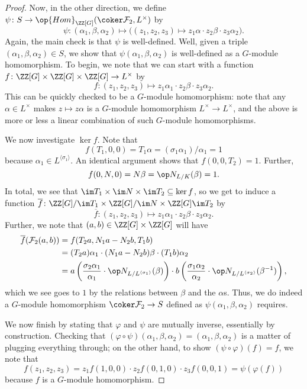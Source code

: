 \documentclass{article}
\begin{document}
\begin{proof}
	Now, in the other direction, we define $\psi\colon S\to\op{Hom}_{\ZZ[G]}(\coker\mathcal F_2,L^\times)$ by
	\[\psi\colon(\alpha_1,\beta,\alpha_2)\mapsto\big((z_1,z_2,z_3)\mapsto z_1\alpha\cdot z_2\beta\cdot z_3\alpha_2\big).\]
	Again, the main check is that $\psi$ is well-defined. Well, given a triple $(\alpha_1,\beta,\alpha_2)\in S$, we show that $\psi(\alpha_1,\beta,\alpha_2)$ is well-defined as a $G$-module homomorphism. To begin, we note that we can start with a function $f\colon\ZZ[G]\times\ZZ[G]\times\ZZ[G]\to L^\times$ by
	\[f\colon(z_1,z_2,z_3)\mapsto z_1\alpha_1\cdot z_2\beta\cdot z_3\alpha_2.\]
	This can be quickly checked to be a $G$-module homomorphism: note that any $\alpha\in L^\times$ makes $z\mapsto z\alpha$ is a $G$-module homomorphism $L^\times\to L^\times$, and the above is more or less a linear combination of such $G$-module homomorphisms.

	We now investigate $\ker f$. Note that
	\[f(T_1,0,0)=T_1\alpha=(\sigma_1\alpha_1)/\alpha_1=1\]
	because $\alpha_1\in L^{\langle\sigma_1\rangle}$. An identical argument shows that $f(0,0,T_2)=1$. Further,
	\[f(0,N,0)=N\beta=\op N_{L/K}(\beta)=1.\]
	In total, we see that $\im T_1\times\im N\times\im T_2\subseteq\ker f$, so we get to induce a function $\overline f\colon\ZZ[G]/\im T_1\times\ZZ[G]/\im N\times\ZZ[G]\im T_2$ by
	\[\overline f\colon(z_1,z_2,z_3)\mapsto z_1\alpha_1\cdot z_2\beta\cdot z_3\alpha_2.\]
	Further, we note that $(a,b)\in\ZZ[G]\times\ZZ[G]$ will have
	\begin{align*}
		\overline f(\mathcal F_2(a,b)) &= f(T_2a,N_1a-N_2b,T_1b) \\
		&= (T_2a)\alpha_1\cdot(N_1a-N_2b)\beta\cdot(T_1b)\alpha_2 \\
		&= a\left(\frac{\sigma_2\alpha_1}{\alpha_1}\cdot\op N_{L/L^{\langle\sigma_1\rangle}}(\beta)\right)\cdot b\left(\frac{\sigma_1\alpha_2}{\alpha_2}\cdot\op N_{L/L^{\langle\sigma_2\rangle}}(\beta^{-1})\right),
	\end{align*}
	which we see goes to $1$ by the relations between $\beta$ and the $\alpha$s. Thus, we do indeed a $G$-module homomorphism $\coker\mathcal F_2\to S$ defined as $\psi(\alpha_1,\beta,\alpha_2)$ requires.

	We now finish by stating that $\varphi$ and $\psi$ are mutually inverse, essentially by construction. Checking that $(\varphi\circ\psi)(\alpha_1,\beta,\alpha_2)=(\alpha_1,\beta,\alpha_2)$ is a matter of plugging everything through; on the other hand, to show $(\psi\circ\varphi)(f)=f$, we note that
	\[f(z_1,z_2,z_3)=z_1f(1,0,0)\cdot z_2f(0,1,0)\cdot z_3f(0,0,1)=\psi(\varphi(f))\]
	because $f$ is a $G$-module homomorphism.
\end{proof}
\end{document}
